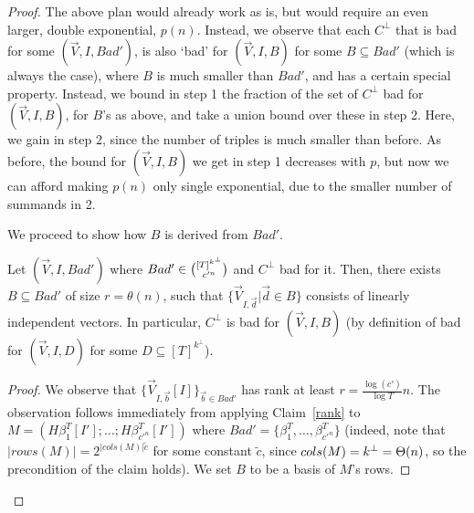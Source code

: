 \begin{proof}

The above plan would already work as is, but would require an even larger, double exponential, $p(n)$. Instead, we observe that each $C^\bot$ that is bad for some $(\vec{V},I,Bad')$, is also `bad' for $(\vec{V},I,B)$ for some $B\subseteq Bad'$ (which is always the case), where $B$ is much smaller than $Bad'$, and has a certain special property. Instead, we bound in step 1 the fraction of the set of $C^\bot$ bad for $(\vec{V},I,B)$, for $B$'s as above, and take a union bound over these in step 2. Here, we gain in step 2, since the number of triples is much smaller than before. 
As before, the bound for $(\vec{V},I,B)$ we get in step 1 decreases with $p$, but now we can afford making $p(n)$ only single exponential, due to the smaller number of summands in 2.

We proceed to show how $B$ is derived from $Bad'$.
\begin{observation}\label{clm:basis}
Let $(\vec{V},I,Bad')$ where $Bad'\in \binom{[T]^{k^\bot}}{c'^n}$ and $C^\bot$ bad for it.  
Then, there exists $B\subseteq Bad'$ of size $r=\theta(n)$, such that
$\{\vec{V}_{I,\vec{d}}|\vec{d}\in B\}$ consists of linearly independent vectors. In particular, $C^\bot$ is bad for $(\vec{V},I,B)$  (by definition of bad for $(\Vec{V},I,D)$ for some $D\subseteq [T]^{k^\bot}$).
\end{observation}

\begin{proof}
We observe that $\big\{\vec{V}_{I,\vec{b}}[I]\big\}_{\vec{b}\in Bad'}$ has rank at least $r=\frac{\log(c')}{\log{T}}n$. The observation follows immediately from applying Claim~\ref{rank} to $M=(H\beta^T_1[I'];\ldots;H\beta^T_{c'^n}[I'])$
where $Bad'=\{\beta^T_1,\ldots,\beta^T_{c'^n}\}$ (indeed, note that $|rows(M)|=2^{|cols(M)|\tilde{c}}$ for some constant $\tilde{c}$, since $cols(M)=k^\bot=\Theta(n)$, so the precondition of the claim holds). We set $B$ to be a basis of $M$'s rows.
\end{proof}


\end{proof}
